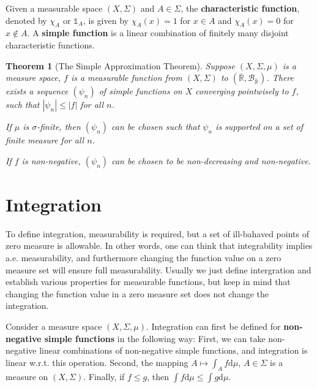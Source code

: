 \documentclass[openany]{book}
\newtheorem{theorem}{Theorem}[chapter]
\theoremstyle{definition}
\theoremstyle{remark}
\begin{document}
Given a measurable space $(X,\Sigma)$ and $A\in\Sigma$, the \textbf{characteristic function}, denoted by $\chi_A$ or $\mathds{1}_A$, is given by $\chi_A(x)=1$ for $x\in A$ and $\chi_A(x)=0$ for $x\not\in A$. A \textbf{simple function} is a linear combination of finitely many disjoint characteristic functions.
\begin{theorem}[The Simple Approximation Theorem]
    Suppose $(X,\Sigma,\mu)$ is a measure space, $f$ is a measurable function from $(X,\Sigma)$ to $(\overline{\mathbb{R}},\mathcal{B}_{\overline{\mathbb{R}}})$. There exists a sequence $(\psi_n)$ of simple functions on $X$ converging pointwisely to $f$, such that $|\psi_n|\le|f|$ for all $n$.

    If $\mu$ is $\sigma$-finite, then $(\psi_n)$ can be chosen such that $\psi_n$ is supported on a set of finite measure for all $n$.

    If $f$ is non-negative, $(\psi_n)$ can be chosen to be non-decreasing and non-negative.
\end{theorem}

\section{Integration}
To define integration, measurability is required, but a set of ill-bahaved points of zero measure is allowable. In other words, one can think that integrability implies a.e. measurability, and furthermore changing the function value on a zero measure set will ensure full measurability. Usually we just define intergration and establish various properties for measurable functions, but keep in mind that changing the function value in a zero measure set does not change the integration.

Consider a measure space $(X,\Sigma,\mu)$. Integration can first be defined for \textbf{non-negative simple functions} in the following way: First, we can take non-negative linear combinations of non-negative simple functions, and integration is linear w.r.t. this operation. Second, the mapping $A\mapsto\int_Af \mathrm{d}\mu$, $A\in\Sigma$ is a measure on $(X,\Sigma)$. Finally, if $f\le g$, then $\int f \mathrm{d}\mu\le\int g \mathrm{d}\mu$.
\end{document}
